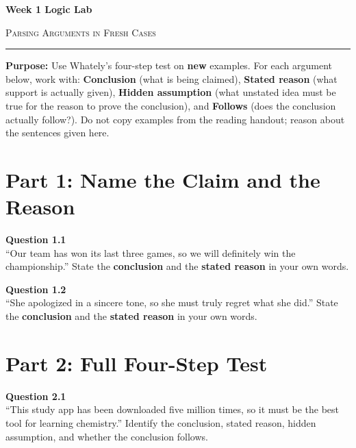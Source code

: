 \documentclass[12pt]{article}
\begin{document}
\begin{center}
{\LARGE\bfseries Week 1 Logic Lab}\par\vspace{0.05em}
{\large\scshape Parsing Arguments in Fresh Cases}\par\vspace{0.1em}
\rule{0.78\textwidth}{0.5pt}\par\vspace{0.15em}
\end{center}

\noindent\textbf{Purpose:} Use Whately's four-step test on \textbf{new} examples. For each argument below, work with: \textbf{Conclusion} (what is being claimed), \textbf{Stated reason} (what support is actually given), \textbf{Hidden assumption} (what unstated idea must be true for the reason to prove the conclusion), and \textbf{Follows} (does the conclusion actually follow?). Do not copy examples from the reading handout; reason about the sentences given here.

\vspace{0.3em}

\section*{Part 1: Name the Claim and the Reason}

\textbf{Question 1.1}\\[-0.15em]
``Our team has won its last three games, so we will definitely win the championship.'' State the \textbf{conclusion} and the \textbf{stated reason} in your own words.


\textbf{Question 1.2}\\[-0.15em]
``She apologized in a sincere tone, so she must truly regret what she did.'' State the \textbf{conclusion} and the \textbf{stated reason} in your own words.


\newpage

\section*{Part 2: Full Four-Step Test}

\textbf{Question 2.1}\\[-0.15em]
``This study app has been downloaded five million times, so it must be the best tool for learning chemistry.'' Identify the conclusion, stated reason, hidden assumption, and whether the conclusion follows.
\end{document}
